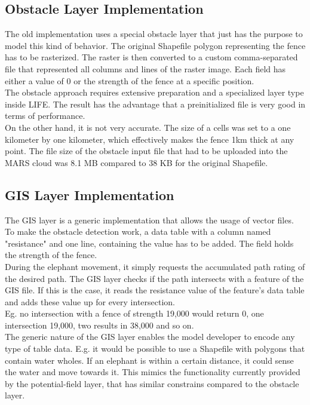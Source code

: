 \subsection{Obstacle Layer Implementation}
The old implementation uses a special obstacle layer that just has the purpose to model this kind of behavior. The original Shapefile polygon representing the fence has to be rasterized. The raster is then converted to a custom comma-separated file that represented all columns and lines of the raster image. Each field has either a value of 0 or the strength of the fence at a specific position.\\
The obstacle approach requires extensive preparation and a specialized layer type inside LIFE. The result has the advantage that a preinitialized file is very good in terms of performance.\\
On the other hand, it is not very accurate. The size of a cells was set to a one kilometer by one kilometer, which effectively makes the fence 1km thick at any point. The file size of the obstacle input file that had to be uploaded into the MARS cloud was 8.1 MB compared to 38 KB for the original Shapefile.


\subsection{GIS Layer Implementation}
The GIS layer is a generic implementation that allows the usage of vector files. To make the obstacle detection work, a data table with a  column named "resistance" and one line, containing the value has to be added. The field holds the strength of the fence.\\
During the elephant movement, it simply requests the accumulated path rating of the desired path. The GIS layer checks if the path intersects with a feature of the GIS file. If this is the case, it reads the resistance value of the feature's data table and adds these value up for every intersection.\\
Eg. no intersection with a fence of strength 19,000 would return 0, one intersection 19,000, two results in 38,000 and so on.\\
The generic nature of the GIS layer enables the model developer to encode any type of table data. E.g. it would be possible to use a Shapefile with polygons that contain water wholes. If an elephant is within a certain distance, it could sense the water and move towards it. This mimics the functionality currently provided by the potential-field layer, that has similar constrains compared to the obstacle layer.



